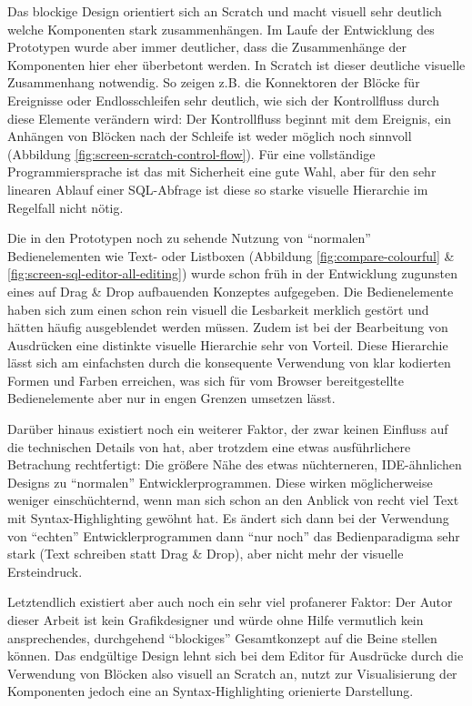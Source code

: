 Das blockige Design orientiert sich an Scratch und macht visuell sehr deutlich welche Komponenten stark zusammenhängen. Im Laufe der Entwicklung des Prototypen wurde aber immer deutlicher, dass die Zusammenhänge der Komponenten hier eher überbetont werden. In Scratch ist dieser deutliche visuelle Zusammenhang notwendig. So zeigen z.B. die Konnektoren der Blöcke für Ereignisse oder Endlosschleifen sehr deutlich, wie sich der Kontrollfluss durch diese Elemente verändern wird: Der Kontrollfluss beginnt mit dem Ereignis, ein Anhängen von Blöcken nach der Schleife ist weder möglich noch sinnvoll (Abbildung \ref{fig:screen-scratch-control-flow}).  Für eine vollständige Programmiersprache ist das mit Sicherheit eine gute Wahl, aber für den sehr linearen Ablauf einer SQL-Abfrage ist diese so starke visuelle Hierarchie im Regelfall nicht nötig.

Die in den Prototypen noch zu sehende Nutzung von ``normalen'' Bedienelementen wie Text- oder Listboxen (Abbildung \ref{fig:compare-colourful} \& \ref{fig:screen-sql-editor-all-editing}) wurde schon früh in der Entwicklung zugunsten eines auf Drag \& Drop aufbauenden Konzeptes aufgegeben. Die Bedienelemente haben sich zum einen schon rein visuell die Lesbarkeit merklich gestört und hätten häufig ausgeblendet werden müssen. Zudem ist bei der Bearbeitung von Ausdrücken eine distinkte visuelle Hierarchie sehr von Vorteil. Diese Hierarchie lässt sich am einfachsten durch die konsequente Verwendung von klar kodierten Formen und Farben erreichen, was sich für vom Browser bereitgestellte Bedienelemente aber nur in engen Grenzen umsetzen lässt.

Darüber hinaus existiert noch ein weiterer Faktor, der zwar keinen Einfluss auf die technischen Details von \idename hat, aber trotzdem eine etwas ausführlichere Betrachung rechtfertigt: Die größere Nähe des etwas nüchterneren, IDE-ähnlichen Designs zu ``normalen'' Entwicklerprogrammen. Diese wirken möglicherweise weniger einschüchternd, wenn man sich schon an den Anblick von recht viel Text mit Syntax-Highlighting gewöhnt hat. Es ändert sich dann bei der Verwendung von ``echten'' Entwicklerprogrammen dann ``nur noch'' das Bedienparadigma sehr stark (Text schreiben statt Drag \& Drop), aber nicht mehr der visuelle Ersteindruck.

Letztendlich existiert aber auch noch ein sehr viel profanerer Faktor: Der Autor dieser Arbeit ist kein Grafikdesigner und würde ohne Hilfe vermutlich kein ansprechendes, durchgehend ``blockiges'' Gesamtkonzept auf die Beine stellen können. Das endgültige Design lehnt sich bei dem Editor für Ausdrücke durch die Verwendung von Blöcken also visuell an Scratch an, nutzt zur Visualisierung der Komponenten jedoch eine an Syntax-Highlighting orienierte Darstellung.


